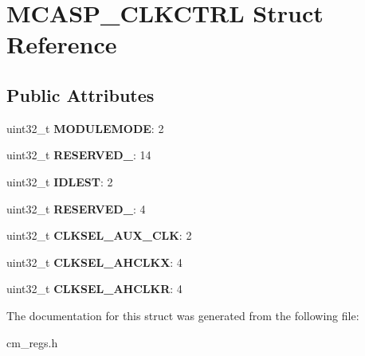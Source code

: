 \hypertarget{structMCASP__CLKCTRL}{\section{M\-C\-A\-S\-P\-\_\-\-C\-L\-K\-C\-T\-R\-L Struct Reference}
\label{structMCASP__CLKCTRL}
}
\subsection*{Public Attributes}
\begin{DoxyCompactItemize}
\item 
\hypertarget{structMCASP__CLKCTRL_ae3ca2c4fdb6e57c8a26e09bf1104f9f9}{uint32\-\_\-t {\bfseries M\-O\-D\-U\-L\-E\-M\-O\-D\-E}\-: 2}\label{structMCASP__CLKCTRL_ae3ca2c4fdb6e57c8a26e09bf1104f9f9}

\item 
\hypertarget{structMCASP__CLKCTRL_ac0a19f32259165995d2806b75a6266b7}{uint32\-\_\-t {\bfseries R\-E\-S\-E\-R\-V\-E\-D\-\_}\-: 14}\label{structMCASP__CLKCTRL_ac0a19f32259165995d2806b75a6266b7}

\item 
\hypertarget{structMCASP__CLKCTRL_a769983fe81ebd9570eee254496c08cc3}{uint32\-\_\-t {\bfseries I\-D\-L\-E\-S\-T}\-: 2}\label{structMCASP__CLKCTRL_a769983fe81ebd9570eee254496c08cc3}

\item 
\hypertarget{structMCASP__CLKCTRL_a78844f3aaee7576a899a6300c717c6e0}{uint32\-\_\-t {\bfseries R\-E\-S\-E\-R\-V\-E\-D\-\_}\-: 4}\label{structMCASP__CLKCTRL_a78844f3aaee7576a899a6300c717c6e0}

\item 
\hypertarget{structMCASP__CLKCTRL_a60d20179470f0bf119572886ab71725b}{uint32\-\_\-t {\bfseries C\-L\-K\-S\-E\-L\-\_\-\-A\-U\-X\-\_\-\-C\-L\-K}\-: 2}\label{structMCASP__CLKCTRL_a60d20179470f0bf119572886ab71725b}

\item 
\hypertarget{structMCASP__CLKCTRL_af7eee81c794b07074018e9d20d40bc4f}{uint32\-\_\-t {\bfseries C\-L\-K\-S\-E\-L\-\_\-\-A\-H\-C\-L\-K\-X}\-: 4}\label{structMCASP__CLKCTRL_af7eee81c794b07074018e9d20d40bc4f}

\item 
\hypertarget{structMCASP__CLKCTRL_a609ae5e9455a3962ced29388ae26fd41}{uint32\-\_\-t {\bfseries C\-L\-K\-S\-E\-L\-\_\-\-A\-H\-C\-L\-K\-R}\-: 4}\label{structMCASP__CLKCTRL_a609ae5e9455a3962ced29388ae26fd41}

\end{DoxyCompactItemize}


The documentation for this struct was generated from the following file\-:\begin{DoxyCompactItemize}
\item 
cm\-\_\-regs.\-h\end{DoxyCompactItemize}
